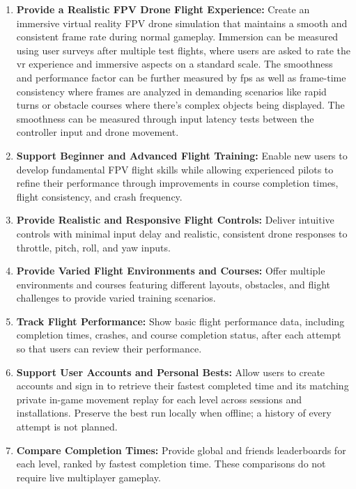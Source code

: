 \documentclass{article}
\begin{document}
\begin{enumerate}
    \item \textbf{Provide a Realistic FPV Drone Flight Experience:} Create an immersive virtual reality FPV drone simulation that maintains a smooth and consistent frame rate during normal gameplay. Immersion can be measured using user surveys after multiple test flights, where users are asked to rate the vr experience and immersive aspects on a standard scale. The smoothness and performance factor can be further measured by fps as well as frame-time consistency where frames are analyzed in demanding scenarios like rapid turns or obstacle courses where there's complex objects being displayed. The smoothness can be measured through input latency tests between the controller input and drone movement. 

    \item \textbf{Support Beginner and Advanced Flight Training:} Enable new users to develop fundamental FPV flight skills while allowing experienced pilots to refine their performance through improvements in course completion times, flight consistency, and crash frequency.

    \item \textbf{Provide Realistic and Responsive Flight Controls:} Deliver intuitive controls with minimal input delay and realistic, consistent drone responses to throttle, pitch, roll, and yaw inputs.

    \item \textbf{Provide Varied Flight Environments and Courses:} Offer multiple environments and courses featuring different layouts, obstacles, and flight challenges to provide varied training scenarios.

    \item \textbf{Track Flight Performance:} Show basic flight performance data, including completion times, crashes, and course completion status, after each attempt so that users can review their performance.

    \item \textbf{Support User Accounts and Personal Bests:} Allow users to create accounts and sign in to retrieve their fastest completed time and its matching private in-game movement replay for each level across sessions and installations. Preserve the best run locally when offline; a history of every attempt is not planned.

    \item \textbf{Compare Completion Times:} Provide global and friends leaderboards for each level, ranked by fastest completion time. These comparisons do not require live multiplayer gameplay.
\end{enumerate}
\end{document}

